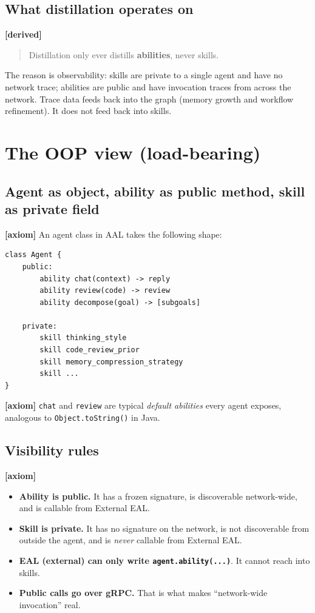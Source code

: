 \documentclass[11pt,a4paper]{article}
\newcommand{\axiom}{\textcolor{axiomcolor}{\textbf{[axiom]}}\xspace}
\newcommand{\derived}{\textcolor{derivedcolor}{\textbf{[derived]}}\xspace}
\begin{document}
\subsection{What distillation operates on}

\derived{}
\begin{quote}
Distillation only ever distills \textbf{abilities}, never skills.
\end{quote}

The reason is observability: skills are private to a single agent and have no
network trace; abilities are public and have invocation traces from across
the network. Trace data feeds back into the graph (memory growth and workflow
refinement). It does not feed back into skills.

\section{The OOP view (load-bearing)}
\label{sec:oop}

\subsection{Agent as object, ability as public method, skill as private field}

\axiom{} An agent class in AAL takes the following shape:

\begin{lstlisting}
class Agent {
    public:
        ability chat(context) -> reply
        ability review(code) -> review
        ability decompose(goal) -> [subgoals]

    private:
        skill thinking_style
        skill code_review_prior
        skill memory_compression_strategy
        skill ...
}
\end{lstlisting}

\axiom{} \texttt{chat} and \texttt{review} are typical \emph{default abilities}
every agent exposes, analogous to \texttt{Object.toString()} in Java.

\subsection{Visibility rules}

\axiom{}
\begin{itemize}[leftmargin=2em,itemsep=0.3em]
    \item \textbf{Ability is public.} It has a frozen signature, is
    discoverable network-wide, and is callable from External EAL.
    \item \textbf{Skill is private.} It has no signature on the network, is
    not discoverable from outside the agent, and is \emph{never} callable
    from External EAL.
    \item \textbf{EAL (external) can only write \texttt{agent.ability(...)}}.
    It cannot reach into skills.
    \item \textbf{Public calls go over gRPC.} That is what makes
    ``network-wide invocation'' real.
\end{itemize}
\end{document}
